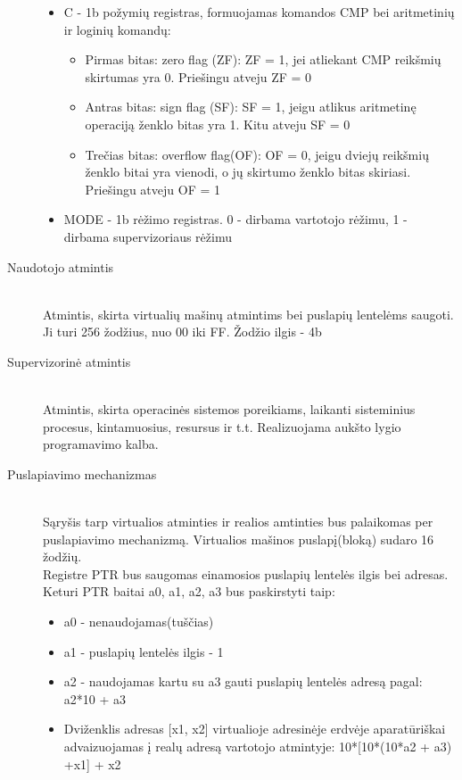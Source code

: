 \begin{description}
\begin{itemize}
  \item C - 1b požymių registras, formuojamas komandos CMP bei aritmetinių ir loginių komandų: \leavevmode
	\begin{itemize}
		\item Pirmas bitas: zero flag (ZF): ZF = 1, jei atliekant CMP reikšmių skirtumas yra 0. Priešingu atveju ZF = 0
		\item Antras bitas: sign flag (SF): SF = 1, jeigu atlikus aritmetinę operaciją ženklo bitas yra 1. Kitu atveju SF = 0		
		\item Trečias bitas: overflow flag(OF): OF = 0, jeigu dviejų reikšmių ženklo bitai yra vienodi, o jų skirtumo ženklo bitas skiriasi. Priešingu atveju OF = 1	
	\end{itemize}
  \item MODE - 1b rėžimo registras. 0 - dirbama vartotojo rėžimu, 1 - dirbama supervizoriaus rėžimu
\end{itemize}

  \item[Naudotojo atmintis] \leavevmode \\
Atmintis, skirta virtualių mašinų atmintims bei puslapių lentelėms saugoti. Ji turi 256 žodžius, nuo 00 iki FF. Žodžio ilgis - 4b
  \item[Supervizorinė atmintis] \leavevmode \\
Atmintis, skirta operacinės sistemos poreikiams, laikanti sisteminius procesus, kintamuosius, resursus ir t.t. Realizuojama aukšto lygio programavimo kalba.

\item[Puslapiavimo mechanizmas] \leavevmode \\
Sąryšis tarp virtualios atminties ir realios amtinties bus palaikomas per puslapiavimo mechanizmą. Virtualios mašinos puslapį(bloką) sudaro 16 žodžių.
\\ Registre PTR bus saugomas einamosios puslapių lentelės ilgis bei adresas. Keturi PTR baitai a0, a1, a2, a3 bus paskirstyti taip:
\begin{itemize}
\item a0 - nenaudojamas(tuščias)
\item a1 - puslapių lentelės ilgis - 1
\item a2 - naudojamas kartu su a3 gauti puslapių lentelės adresą pagal: a2*10 + a3
\item Dviženklis adresas [x1, x2]  virtualioje adresinėje erdvėje aparatūriškai advaizuojamas į realų adresą vartotojo atmintyje: 10*[10*(10*a2 + a3) +x1] + x2
\end{itemize}


\end{description}
